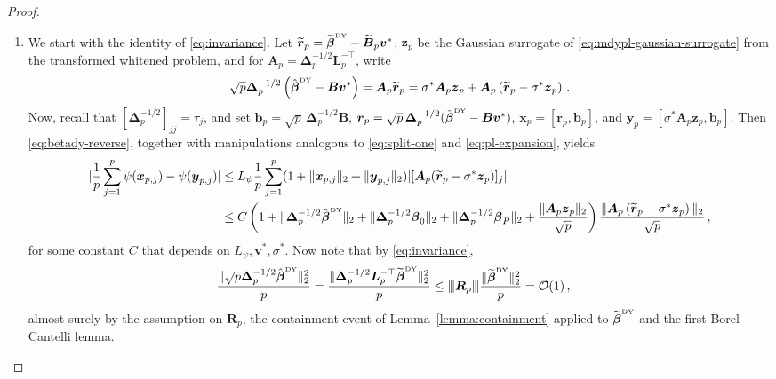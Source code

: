 \documentclass{article}
\makeatletter
\theoremstyle{definition}
\newcommand{\vnorm}[1]{%
	\ensuremath{%
		\if@display
		\left\| #1 \right\|
		\else
		\| #1 \|
		\fi
	}%
}
\newcommand{\abs}[1]{%
	\ensuremath{%
		\if@display
		\left| #1 \right|
		\else
		\lvert #1 \rvert
		\fi
	}%
}
\newcommand{\mnorm}[1]{{\left\vert\kern-0.25ex\left\vert\kern-0.25ex\left\vert #1
		\right\vert\kern-0.25ex\right\vert\kern-0.25ex\right\vert}}
\newcommand*{\bb}{\boldsymbol}
\newcommand{\betady}{\ensuremath{\hat{\bbeta}^{\textrm{\tiny DY}}}}
\def\bv{\bb{v}}
\def\bbeta{\bb{\beta}}
\makeatother
\begin{document}
\begin{bibunit}
\begin{proof}
\begin{enumerate}[label=(\roman{*})]
\item We start with the identity of \eqref{eq:invariance}. Let $\widetilde{\bb r}_p = \widetilde{\bb \beta}^{\textrm{\tiny DY}} - \widetilde{\bb B}_p \bv^*$, $\bb z_p$ be the Gaussian surrogate of \eqref{eq:mdypl-gaussian-surrogate} 
from the transformed whitened problem, 
and for $\bb A_p = \bb \Delta_p^{-1/2} \bb L_p^{-\top}$, write 
\begin{equation}
    \label{eq:betady-reverse}
    \sqrt{p} \bb \Delta_p^{-1/2} \left(\betady - \bb B \bv^* \right) = \bb A_p \widetilde{\bb r}_p = \sigma^* \bb A_p  \bb z_p + \bb A_p \left(\widetilde{\bb r}_p - \sigma^* \bb z_p \right) \,. 
\end{equation}
Now, recall that $[\bb \Delta_p^{-1/2}]_{jj}=\tau_j$, and set
$\bb b_p=\sqrt p\,\bb \Delta_p^{-1/2}\bb B$,
$\bb r_p=\sqrt p\,\bb \Delta_p^{-1/2}(\betady-\bb B\bv^*)$,
$\bb x_p=[\bb r_p,\bb b_p]$, and
$\bb y_p=[\sigma^*\bb A_p\bb z_p,\bb b_p]$.
Then \eqref{eq:betady-reverse}, together with manipulations analogous to
\eqref{eq:split-one} and \eqref{eq:pl-expansion}, yields
\begin{equation}
    \label{eq:first-tau-expansion} 
    \begin{aligned}
    \abs{\frac{1}{p} \sum_{j =1}^{p} \psi(\bb x_{p,j}) - \psi(\bb y_{p,j})} 
    &\leq L_{\psi} \frac{1}{p} \sum_{j = 1}^{p} (1 + \vnorm{\bb x_{p,j}}_2 + \vnorm{\bb y_{p,j}}_2) \abs{[\bb A_p(\widetilde{\bb r}_p - \sigma^* \bb z_p)]_j} \\ 
    & \leq C \left(1 + \vnorm{\bb \Delta_p^{-1/2} \betady}_2 + \vnorm{\bb \Delta_p^{-1/2} \bbeta_0}_2 +  \vnorm{\bb \Delta_p^{-1/2} \bbeta_P}_2 + \frac{\vnorm{\bb A_p \bb z_p}_2}{\sqrt{p}} \right) \frac{\vnorm{\bb A_p \left(\widetilde{\bb r}_p - \sigma^* \bb z_p\right)}_2}{\sqrt p} \,,
    \end{aligned}
\end{equation}
for some constant $C$ that depends on $L_\psi, \bv^*, \sigma^*$. Now note that by \eqref{eq:invariance}, 
\begin{equation}
    \label{eq:bb-bounds} 
    \begin{aligned}
        \frac{\vnorm{\sqrt{p} \bb \Delta_p^{-1/2} \betady}_2^2}{p} &= \frac{\vnorm{ \bb \Delta_p^{-1/2} \bb L_p^{-\top} \widetilde{\bb \beta}^{\textrm{\tiny DY}}}_2^2}{p} 
        \leq \mnorm{\bb R_p} \frac{\vnorm{ \widetilde{\bb \beta}^{\textrm{\tiny DY}}}_2^2}{p} 
        = \mathcal{O}(1) \,, 
    \end{aligned}
\end{equation}
almost surely by the assumption on $\bb R_p$, the containment event of Lemma~\ref{lemma:containment} applied to $\widetilde{\bb \beta}^{\textrm{\tiny DY}}$ and the first Borel--Cantelli lemma. 

\end{enumerate}
\end{proof}
\end{bibunit}
\end{document}

